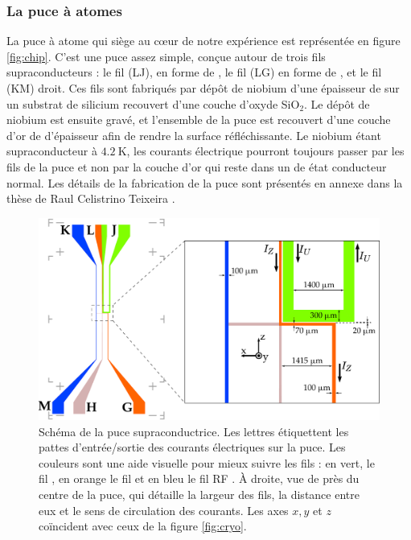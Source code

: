 	\subsubsection*{La puce à atomes}
\noindent La puce à atome qui siège au c\oe ur de notre expérience est représentée en figure \eqref{fig:chip}.
C'est une puce assez simple, conçue autour de trois fils supraconducteurs : le fil (LJ), en forme de , le fil (LG) en forme de , et le fil (KM) droit.
Ces fils sont fabriqués par dépôt de niobium d'une épaisseur de  sur un substrat de silicium recouvert d'une couche d'oxyde SiO$_2$.
Le dépôt de niobium est ensuite gravé, et l'ensemble de la puce est recouvert d'une couche d'or de  d'épaisseur afin de rendre la surface réfléchissante.
Le niobium étant supraconducteur à $\SI{4.2}{\K}$, les courants électrique pourront toujours passer par les fils de la puce et non par la couche d'or qui reste dans un de état conducteur normal.
Les détails de la fabrication de la puce sont présentés en annexe dans la thèse de Raul Celistrino Teixeira \cite{PHD_CELISTRINO}.
%
\begin{figure}[!h]
\centering
\includegraphics[width=\linewidth]{figures/setup/coldatoms/chip}
\caption[Schéma de la puce à atomes supraconductrice]{Schéma de la puce supraconductrice.
Les lettres étiquettent les pattes d'entrée/sortie des courants électriques sur la puce.
Les couleurs sont une aide visuelle pour mieux suivre les fils : en vert, le \og fil \fg{}, en orange le \og fil \fg{} et en bleu le \og fil RF \fg{}.
\`A droite, vue de près du centre de la puce, qui détaille la largeur des fils, la distance entre eux et le sens de circulation des courants.
Les axes $x,y$ et $z$ coïncident avec ceux de la figure \eqref{fig:cryo}.
}
\label{fig:chip}
\end{figure}
%

